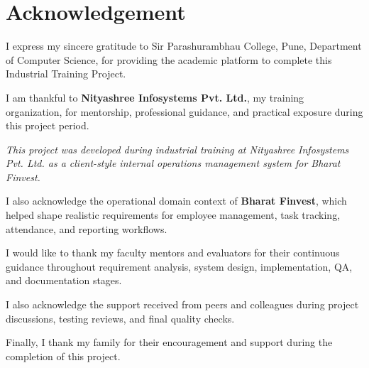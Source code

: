 \chapter*{Acknowledgement}
I express my sincere gratitude to Sir Parashurambhau College, Pune, Department of Computer Science, for providing the academic platform to complete this Industrial Training Project.

I am thankful to \textbf{Nityashree Infosystems Pvt. Ltd.}, my training organization, for mentorship, professional guidance, and practical exposure during this project period.

\textit{This project was developed during industrial training at Nityashree Infosystems Pvt. Ltd. as a client-style internal operations management system for Bharat Finvest.}

I also acknowledge the operational domain context of \textbf{Bharat Finvest}, which helped shape realistic requirements for employee management, task tracking, attendance, and reporting workflows.

I would like to thank my faculty mentors and evaluators for their continuous guidance throughout requirement analysis, system design, implementation, QA, and documentation stages.

I also acknowledge the support received from peers and colleagues during project discussions, testing reviews, and final quality checks.

Finally, I thank my family for their encouragement and support during the completion of this project.
